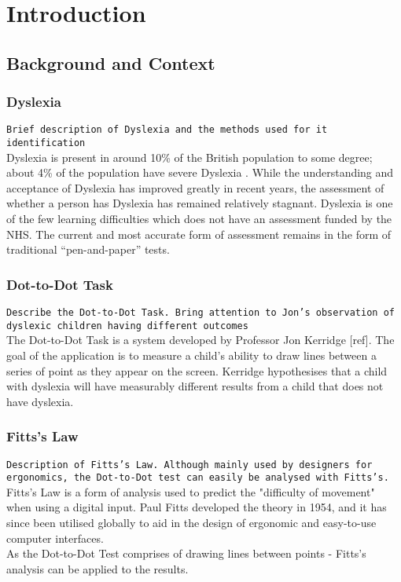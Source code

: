\section{Introduction}
	\subsection{Background and Context}
		\subsubsection{Dyslexia}
			\texttt{Brief description of Dyslexia and the methods used for it identification}\\
			Dyslexia is present in around 10\% of the British population to some degree; about 4\% of the population have severe Dyslexia \cite{BritishDyslexiaAssociation} \cite{NHSChoices}. While the understanding and acceptance of Dyslexia has improved greatly in recent years, the assessment of whether a person has Dyslexia has remained relatively stagnant. 
			Dyslexia is one of the few learning difficulties which does not have an assessment funded by the NHS. The current and most accurate form of assessment remains in the form of traditional “pen-and-paper” tests. \cite{BritishDyslexiaAssociation2016} \cite{NHSChoicesa}
		
		\subsubsection{Dot-to-Dot Task}
			\texttt{Describe the Dot-to-Dot Task. Bring attention to Jon's observation of dyslexic children having different outcomes}\\
			The Dot-to-Dot Task is a system developed by Professor Jon Kerridge [ref]. The goal of the application is to measure a child's ability to draw lines between a series of point as they appear on the screen. Kerridge hypothesises that a child with dyslexia will have measurably different results from a child that does not have dyslexia.
		
		\subsubsection{Fitts's Law}
			\texttt{Description of Fitts's Law. Although mainly used by designers for ergonomics, the Dot-to-Dot test can easily be analysed with Fitts's.}\\
			Fitts's Law is a form of analysis used to predict the "difficulty of movement" when using a digital input. Paul Fitts developed the theory in 1954, and it has since been utilised globally to aid in  the design of ergonomic and easy-to-use computer interfaces.\\ 
			As the Dot-to-Dot Test comprises of drawing lines between points - Fitts's analysis can be applied to the results.
		
